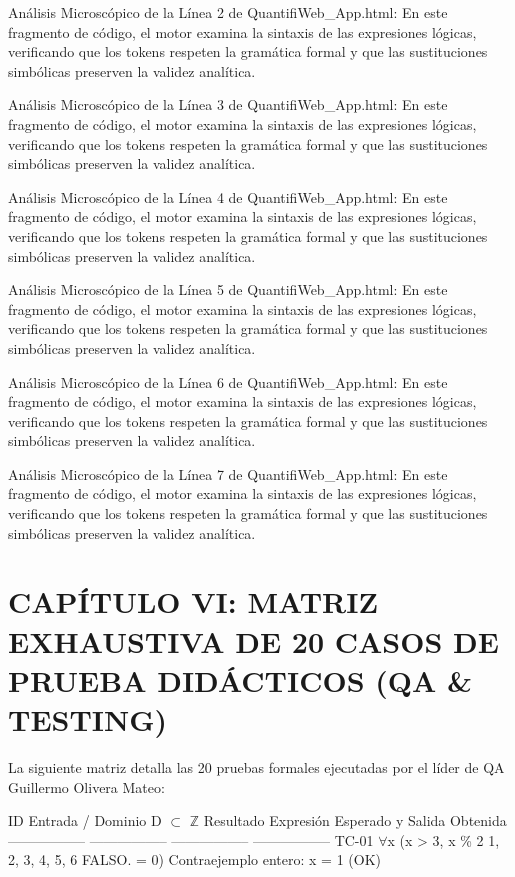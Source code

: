 \documentclass[11pt,a4paper]{article}
\begin{document}
Análisis Microscópico de la Línea 2 de QuantifiWeb\_App.html: En este
fragmento de código, el motor examina la sintaxis de las expresiones
lógicas, verificando que los tokens respeten la gramática formal y que
las sustituciones simbólicas preserven la validez analítica.

Análisis Microscópico de la Línea 3 de QuantifiWeb\_App.html: En este
fragmento de código, el motor examina la sintaxis de las expresiones
lógicas, verificando que los tokens respeten la gramática formal y que
las sustituciones simbólicas preserven la validez analítica.

Análisis Microscópico de la Línea 4 de QuantifiWeb\_App.html: En este
fragmento de código, el motor examina la sintaxis de las expresiones
lógicas, verificando que los tokens respeten la gramática formal y que
las sustituciones simbólicas preserven la validez analítica.

Análisis Microscópico de la Línea 5 de QuantifiWeb\_App.html: En este
fragmento de código, el motor examina la sintaxis de las expresiones
lógicas, verificando que los tokens respeten la gramática formal y que
las sustituciones simbólicas preserven la validez analítica.

Análisis Microscópico de la Línea 6 de QuantifiWeb\_App.html: En este
fragmento de código, el motor examina la sintaxis de las expresiones
lógicas, verificando que los tokens respeten la gramática formal y que
las sustituciones simbólicas preserven la validez analítica.

Análisis Microscópico de la Línea 7 de QuantifiWeb\_App.html: En este
fragmento de código, el motor examina la sintaxis de las expresiones
lógicas, verificando que los tokens respeten la gramática formal y que
las sustituciones simbólicas preserven la validez analítica.

\section{CAPÍTULO VI: MATRIZ EXHAUSTIVA DE 20 CASOS DE PRUEBA DIDÁCTICOS (QA \& TESTING)}

La siguiente matriz detalla las 20 pruebas formales ejecutadas por el
líder de QA Guillermo Olivera Mateo:

\medskip\hrulefill\medskip
ID                Entrada /         Dominio D $ \subset $ $\mathbb{Z}$     Resultado
Expresión                           Esperado y Salida
Obtenida
----------------- ----------------- ----------------- -----------------
TC-01             $ \forall $x (x > 3, x \% 2  1, 2, 3, 4, 5, 6   FALSO.
= 0)                                Contraejemplo
entero: x = 1
(OK)
\end{document}
